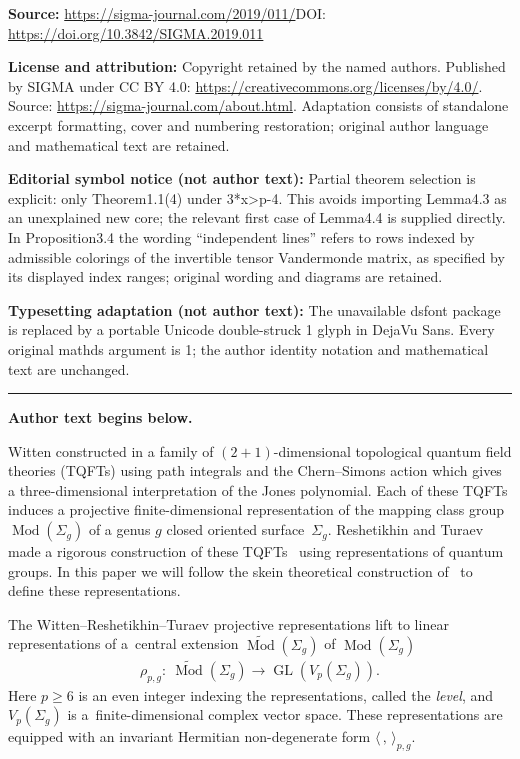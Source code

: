 \documentclass[11pt]{article}
\newcommand{\GL}{\operatorname{GL}}
\newcommand{\Mod}{\operatorname{Mod}}
\newcommand{\mcg}{\Mod(\Sigma_g)}
\newcommand{\emcg}{\widetilde{\Mod}(\Sigma_g)}
\numberwithin{equation}{section}
\begin{document}
\noindent\textbf{Source:} \url{https://sigma-journal.com/2019/011/}\quad DOI: \url{https://doi.org/10.3842/SIGMA.2019.011}\par
\noindent\textbf{License and attribution:} Copyright retained by the named authors. Published by SIGMA under CC BY 4.0: \url{https://creativecommons.org/licenses/by/4.0/}. Source: \url{https://sigma-journal.com/about.html}. Adaptation consists of standalone excerpt formatting, cover and numbering restoration; original author language and mathematical text are retained.\par
\noindent\textbf{Editorial symbol notice (not author text):} Partial theorem selection is explicit: only Theorem1.1(4) under 3*x>p-4. This avoids importing Lemma4.3 as an unexplained new core; the relevant first case of Lemma4.4 is supplied directly. In Proposition3.4 the wording “independent lines” refers to rows indexed by admissible colorings of the invertible tensor Vandermonde matrix, as specified by its displayed index ranges; original wording and diagrams are retained.\par
\noindent\textbf{Typesetting adaptation (not author text):} The unavailable dsfont package is replaced by a portable Unicode double-struck 1 glyph in DejaVu Sans. Every original mathds argument is 1; the author identity notation and mathematical text are unchanged.\par
\medskip\hrule\medskip\noindent\textbf{Author text begins below.}\par
\setcounter{section}{1}
\setcounter{subsection}{0}
\setcounter{subsubsection}{0}
\setcounter{Theorem}{0}
\setcounter{equation}{0}
Witten constructed in \cite{Wi2} a family of $(2+1)$-dimensional topological quantum field theories (TQFTs) using path integrals and the Chern--Simons action which gives a three-dimensional interpretation of the Jones polynomial. Each of these TQFTs induces a projective finite-dimensional representation of the mapping class group $\mcg$ of a genus $g$ closed oriented surface~$\Sigma_g$. Reshetikhin and Turaev made a rigorous construction of these TQFTs~\cite{RT} using representations of quantum groups. In this paper we will follow the skein theoretical construction of~\cite{BHMV2, Li2} to define these representations.

The Witten--Reshetikhin--Turaev projective representations lift to linear representations of a~central extension $\emcg$ of $\mcg$
\begin{gather*} \rho_{p,g}\colon \ \emcg \rightarrow \GL(V_p(\Sigma_g)).\end{gather*}
Here $p\geq 6$ is an even integer indexing the representations, called the \textit{level}, and $V_p(\Sigma_g)$ is a~finite-dimensional complex vector space. These representations are equipped with an invariant Hermitian non-degenerate form $\langle \, ,\, \rangle_{p,g}$.
\end{document}
